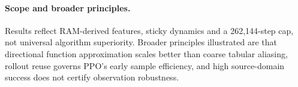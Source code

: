 \paragraph{Scope and broader principles.}
Results reflect RAM-derived features, sticky dynamics and a 262,144-step cap, not universal
algorithm superiority. Broader principles illustrated are that directional function approximation
scales better than coarse tabular aliasing, rollout reuse governs PPO's early sample efficiency,
and high source-domain success does not certify observation robustness.
